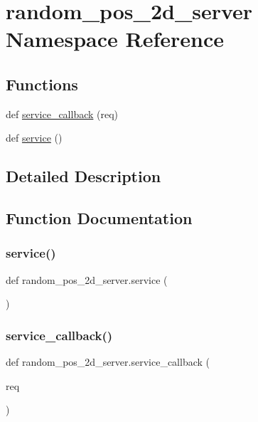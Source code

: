 \hypertarget{namespacerandom__pos__2d__server}{}\section{random\+\_\+pos\+\_\+2d\+\_\+server Namespace Reference}
\label{namespacerandom__pos__2d__server}
\subsection*{Functions}
\begin{DoxyCompactItemize}
\item 
def \hyperlink{namespacerandom__pos__2d__server_acea6055b7f7158e493ca500dea9830f1}{service\+\_\+callback} (req)
\item 
def \hyperlink{namespacerandom__pos__2d__server_af8fcba10d5fa17d4bd7aec0bb178fc54}{service} ()
\end{DoxyCompactItemize}


\subsection{Detailed Description}
\begin{DoxyVerb}\end{DoxyVerb}
 

\subsection{Function Documentation}
\mbox{\label{namespacerandom__pos__2d__server_af8fcba10d5fa17d4bd7aec0bb178fc54}} 
\subsubsection{\texorpdfstring{service()}{service()}}
{\footnotesize\ttfamily def random\+\_\+pos\+\_\+2d\+\_\+server.\+service (\begin{DoxyParamCaption}{ }\end{DoxyParamCaption})}

\mbox{\label{namespacerandom__pos__2d__server_acea6055b7f7158e493ca500dea9830f1}} 
\subsubsection{\texorpdfstring{service\+\_\+callback()}{service\_callback()}}
{\footnotesize\ttfamily def random\+\_\+pos\+\_\+2d\+\_\+server.\+service\+\_\+callback (\begin{DoxyParamCaption}\item[{}]{req }\end{DoxyParamCaption})}

